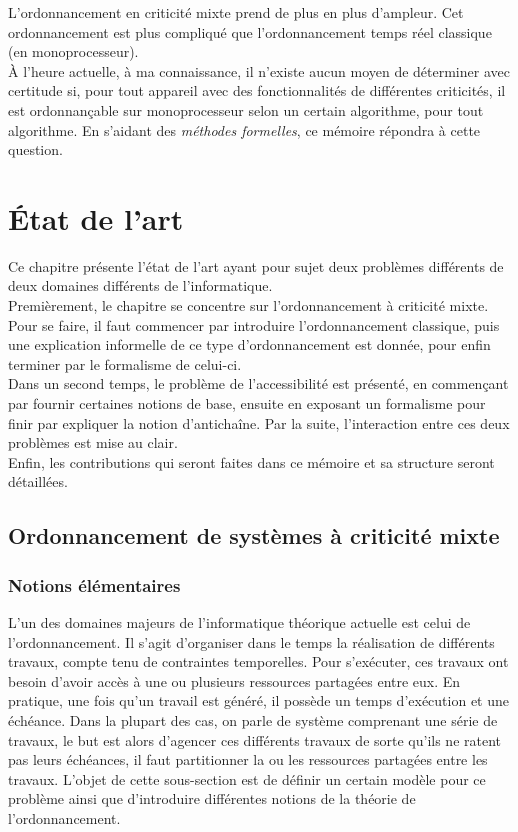 \documentclass[12pt,a4paper,oneside]{book}
\theoremstyle{break}
\theoremstyle{breakplain}
\begin{document}
L'ordonnancement en criticité mixte prend de plus en plus d'ampleur. Cet ordonnancement est plus compliqué que l'ordonnancement temps réel classique (en monoprocesseur).\\
À l'heure actuelle, à ma connaissance, il n'existe aucun moyen de déterminer avec certitude si, pour tout appareil avec des fonctionnalités de différentes criticités, il est ordonnançable sur monoprocesseur selon un certain algorithme, pour tout algorithme. En s'aidant des \textit{méthodes formelles}, ce mémoire répondra à cette question.

\chapter{État de l'art}
Ce chapitre présente l'état de l'art ayant pour sujet deux problèmes différents de deux domaines différents de l'informatique.\\
Premièrement, le chapitre se concentre sur l'ordonnancement à criticité mixte. Pour se faire, il faut commencer par introduire l'ordonnancement classique, puis une explication informelle de ce type d'ordonnancement est donnée, pour enfin terminer par le formalisme de celui-ci.\\
Dans un second temps, le problème de l'accessibilité est présenté, en commençant par fournir certaines notions de base, ensuite en exposant un formalisme pour finir par expliquer la notion d'antichaîne. Par la suite, l'interaction entre ces deux problèmes est mise au clair.\\
Enfin, les contributions  qui seront faites dans ce mémoire et sa structure seront détaillées.

\section{Ordonnancement de systèmes à criticité mixte}
\subsection{Notions élémentaires}
L'un des domaines majeurs de l'informatique théorique actuelle est celui de l'ordonnancement. Il s'agit d'organiser dans le temps la réalisation de différents travaux, compte tenu de contraintes temporelles. Pour s'exécuter, ces travaux ont besoin d'avoir accès à une ou plusieurs ressources partagées entre eux. En pratique, une fois qu'un travail est généré, il possède un temps d'exécution et une échéance. Dans la plupart des cas, on parle de système comprenant une série de travaux, le but est alors d'agencer ces différents travaux de sorte qu'ils ne ratent pas leurs échéances, il faut partitionner la ou les ressources partagées entre les travaux. L'objet de cette sous-section est de définir un certain modèle pour ce problème ainsi que d'introduire différentes notions de la théorie de l'ordonnancement.
\end{document}
